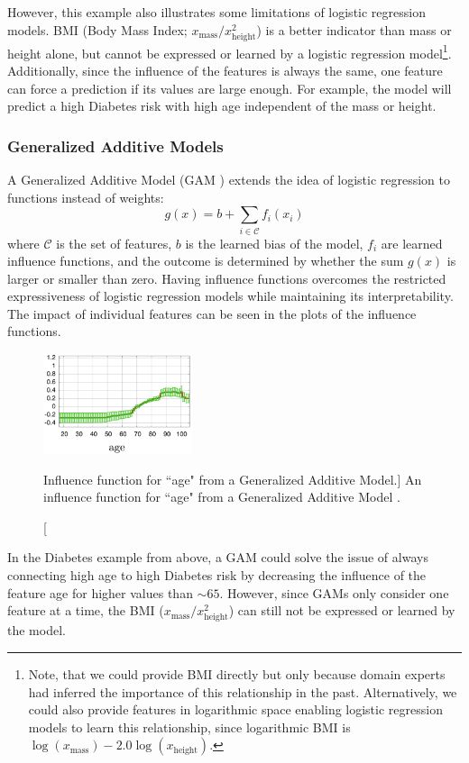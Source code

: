 However, this example also illustrates some limitations of logistic regression models.
BMI (Body Mass Index; $x_\text{mass} / x_\text{height}^2$) is a better indicator than mass or height alone, but cannot be expressed or learned by a logistic regression model\footnote{Note, that we could provide BMI directly but only because domain experts had inferred the importance of this relationship in the past. Alternatively, we could also provide features in logarithmic space enabling logistic regression models to learn this relationship, since logarithmic BMI is $\log{(x_\text{mass})} - 2.0 \log{(x_\text{height})}$.}.
Additionally, since the influence of the features is always the same, one feature can force a prediction if its values are large enough.
For example, the model will predict a high Diabetes risk with high age independent of the mass or height.

\subsubsection{Generalized Additive Models}
A Generalized Additive Model (GAM \cite{gam}) extends the idea of logistic regression to functions instead of weights:
\[
g(x) = b + \sum_{i \in \mathcal{C}} f_i(x_i)
\]
where $\mathcal{C}$ is the set of features, $b$ is the learned bias of the model, $f_i$ are learned influence functions, and the outcome is determined by whether the sum $g(x)$ is larger or smaller than zero.
Having influence functions overcomes the restricted expressiveness of logistic regression models while maintaining its interpretability.
The impact of individual features can be seen in the plots of the influence functions.

\begin{figure}
\centering
\includegraphics[height=8em,valign=t]{tex/introduction/age.png}
\caption[Influence function for ``age" from a Generalized Additive Model.]{
An influence function for ``age" from a Generalized Additive Model \cite{Caruana:2015:IMH:2783258.2788613}.
}
\label{figs:age}
\end{figure}

In the Diabetes example from above, a GAM could solve the issue of always connecting high age to high Diabetes risk by decreasing the influence of the feature age for higher values than ${\sim}65$.
However, since GAMs only consider one feature at a time, the BMI ($x_\text{mass} / x_\text{height}^2$) can still not be expressed or learned by the model.

